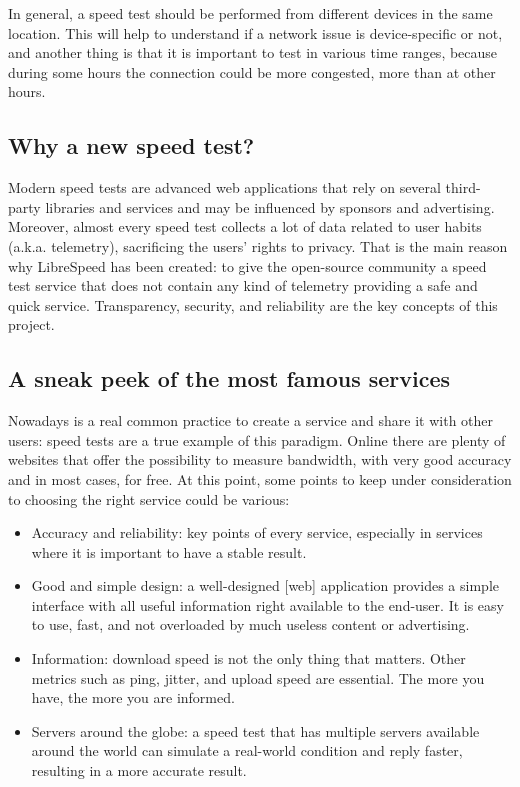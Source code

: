 \documentclass{article}
\begin{document}
In general, a speed test should be performed from different devices in the same location. This will help to understand if a network issue is device-specific or not, and another thing is that it is important to test in various time ranges, because during some hours the connection could be more congested, more than at other hours.

\subsection{Why a new speed test?}
Modern speed tests are advanced web applications that rely on several third-party libraries and services and may be influenced by sponsors and advertising. Moreover, almost every speed test collects a lot of data related to user habits (a.k.a. telemetry), sacrificing the users' rights to privacy.
That is the main reason why LibreSpeed has been created: to give the open-source community a speed test service that does not contain any kind of telemetry providing a safe and quick service. Transparency, security, and reliability are the key concepts of this project.

\subsection{A sneak peek of the most famous services}
Nowadays is a real common practice to create a service and share it with other users: speed tests are a true example of this paradigm. Online there are plenty of websites that offer the possibility to measure bandwidth, with very good accuracy and in most cases, for free. At this point, some points to keep under consideration to choosing the right service could be various:

\begin{itemize}
\item Accuracy and reliability: key points of every service, especially in services where it is important to have a stable result.
\item Good and simple design: a well-designed [web] application provides a simple interface with all useful information right available to the end-user. It is easy to use, fast, and not overloaded by much useless content or advertising.
\item Information: download speed is not the only thing that matters. Other metrics such as ping, jitter, and upload speed are essential. The more you have, the more you are informed.
\item Servers around the globe: a speed test that has multiple servers available around the world can simulate a real-world condition and reply faster, resulting in a more accurate result.
\end{itemize}
\end{document}
